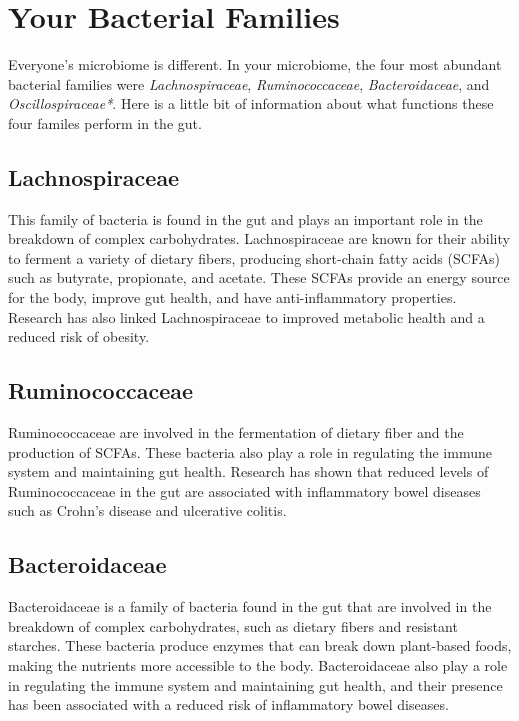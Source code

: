 \documentclass[
]{article}
\begin{document}
\newpage

\section{Your Bacterial Families}

Everyone's microbiome is different. In your microbiome, the four most
abundant bacterial families were \textit{Lachnospiraceae},
\textit{Ruminococcaceae}, \textit{Bacteroidaceae}, and
\textit{Oscillospiraceae*}. Here is a little bit of information about
what functions these four familes perform in the gut.

\subsection{Lachnospiraceae}

\begin{small}
This family of bacteria is found in the gut and plays an important role in the 
breakdown of complex carbohydrates. Lachnospiraceae are known for their ability 
to ferment a variety of dietary fibers, producing short-chain fatty acids 
(SCFAs) such as butyrate, propionate, and acetate. These SCFAs provide an energy
source for the body, improve gut health, and have anti-inflammatory properties. 
Research has also linked Lachnospiraceae to improved metabolic health and a 
reduced risk of obesity.
\end{small}

\subsection{Ruminococcaceae}

\begin{small}
Ruminococcaceae are involved in the fermentation of dietary fiber and the 
production of SCFAs. These bacteria also play a role in regulating the immune 
system and maintaining gut health. Research has shown that reduced levels of 
Ruminococcaceae in the gut are associated with inflammatory bowel diseases such 
as Crohn's disease and ulcerative colitis.
\end{small}

\subsection{Bacteroidaceae}

\begin{small}
Bacteroidaceae is a family of bacteria found in the gut that are involved in the
breakdown of complex carbohydrates, such as dietary fibers and resistant 
starches. These bacteria produce enzymes that can break down plant-based foods, 
making the nutrients more accessible to the body. Bacteroidaceae also play a 
role in regulating the immune system and maintaining gut health, and their 
presence has been associated with a reduced risk of inflammatory bowel diseases.
\end{small}
\end{document}
